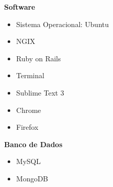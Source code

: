    \textbf{Software}
   \begin{itemize}
    \item Sistema Operacional: Ubuntu
    \item NGIX
    \item Ruby on Rails
    \item Terminal
    \item Sublime Text 3
    \item Chrome
    \item Firefox
   \end{itemize}
   
   \textbf{Banco de Dados}
   \begin{itemize}
    \item MySQL
    \item MongoDB
   \end{itemize}

    
 


 
